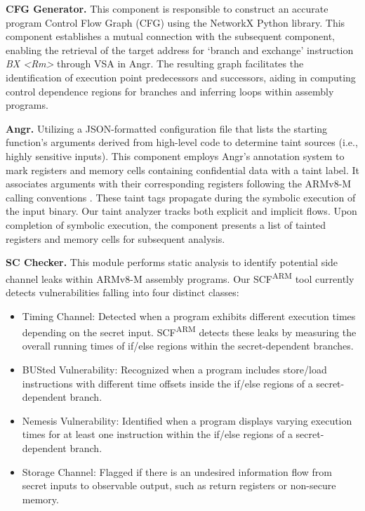 \textbf{CFG Generator.} This component is responsible to construct an accurate program Control Flow Graph (CFG) using the NetworkX \cite{networkX} Python library. This component establishes a mutual connection with the subsequent component, enabling the retrieval of the target address for ‘branch and exchange’ instruction \textit{BX <Rm>} through \ac{VSA} in Angr. The resulting graph facilitates the identification of execution point predecessors and successors, aiding in computing control dependence regions for branches and inferring loops within assembly programs.

\textbf{Angr.} Utilizing a JSON-formatted configuration file that lists the starting function's arguments derived from high-level code to determine taint sources (i.e., highly sensitive inputs). This component employs Angr's annotation system to mark registers and memory cells containing confidential data with a taint label. It associates arguments with their corresponding registers following the ARMv8-M calling conventions \cite{armv8m_ref_manual}. These taint tags propagate during the symbolic execution of the input binary. Our taint analyzer tracks both explicit and implicit flows. Upon completion of symbolic execution, the component presents a list of tainted registers and memory cells for subsequent analysis. 

\textbf{SC Checker.} This module performs static analysis to identify potential side channel leaks within ARMv8-M assembly programs. Our \ac{SCF}\textsuperscript{ARM} tool currently detects vulnerabilities falling into four distinct classes:

\begin{itemize}

\item Timing Channel: Detected when a program exhibits different execution times depending on the secret input. \ac{SCF}\textsuperscript{ARM} detects these leaks by measuring the overall running times of if/else regions within the secret-dependent branches.

\item BUSted Vulnerability: Recognized when a program includes store/load instructions with different time offsets inside the if/else regions of a secret-dependent branch.

\item Nemesis Vulnerability: Identified when a program displays varying execution times for at least one instruction within the if/else regions of a secret-dependent branch.

\item Storage Channel: Flagged if there is an undesired information flow from secret inputs to observable output, such as return registers or non-secure memory.

\end{itemize}
